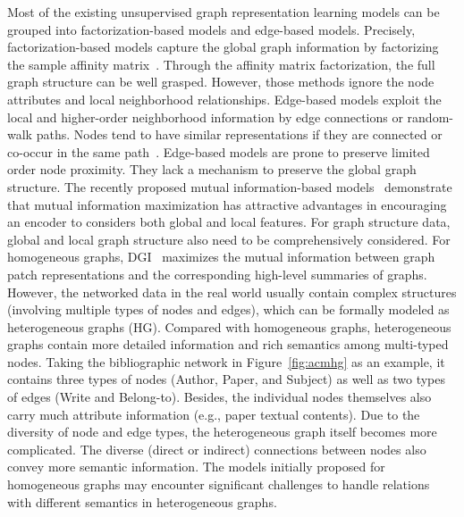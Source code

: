 \documentclass[conference]{IEEEtran}
\begin{document}
	Most of the existing unsupervised graph representation learning models can be grouped into factorization-based models and edge-based models. Precisely, factorization-based models capture the global graph information by factorizing the sample affinity matrix~\cite{zhang2016collective,yang2015network,zhang2016collective}. Through the affinity matrix factorization, the full graph structure can be well grasped. However, those methods ignore the node attributes and local neighborhood relationships. Edge-based models exploit the local and higher-order neighborhood information by edge connections or random-walk paths. Nodes tend to have similar representations if they are connected or co-occur in the same path~\cite{KW16,DN17,HYL17,PAS14}. Edge-based models are prone to preserve limited order node proximity. They lack a mechanism to preserve the global graph structure. The recently proposed mutual information-based models~\cite{HFMGBTB19,velivckovic2018deep,sun2019infograph} demonstrate that mutual information maximization has attractive advantages in encouraging an encoder to considers both global and local features. For graph structure data, global and local graph structure also need to be comprehensively considered. For homogeneous graphs, DGI~\cite{velivckovic2018deep} maximizes the mutual information between graph patch representations and the corresponding high-level summaries of graphs. 
	However, the networked data in the real world usually contain complex structures (involving multiple types of nodes and edges), which can be formally modeled as heterogeneous graphs (HG). Compared with homogeneous graphs, heterogeneous graphs contain more detailed information and rich semantics among multi-typed nodes. Taking the bibliographic network in Figure~\ref{fig:acmhg} as an example, it contains three types of nodes (Author, Paper, and Subject) as well as two types of edges (Write and Belong-to). Besides, the individual nodes themselves also carry much attribute information (e.g., paper textual contents). Due to the diversity of node and edge types, the heterogeneous graph itself becomes more complicated. The diverse (direct or indirect) connections between nodes also convey more semantic information. The models initially proposed for homogeneous graphs may encounter significant challenges to handle relations with different semantics in heterogeneous graphs. 
	
\end{document}
